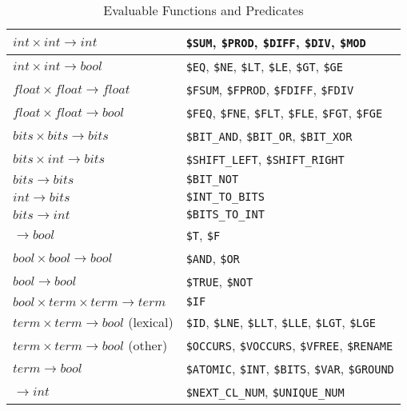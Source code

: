 \documentclass[11pt]{article}
\begin{document}
\begin{table}[ht] \centering
\caption{Evaluable Functions and Predicates}  \label{eval-tab}
\begin{tabular}{|l|l|}
\hline
$int \times int \rightarrow int$ & \verb:$SUM:, \verb:$PROD:, \verb:$DIFF:, \verb:$DIV:, \verb:$MOD: \\
\hline
$int \times int \rightarrow bool$ & \verb:$EQ:, \verb:$NE:, \verb:$LT:, \verb:$LE:, \verb:$GT:, \verb:$GE: \\
\hline
\hline
$float \times float \rightarrow float$ & \verb:$FSUM:, \verb:$FPROD:, \verb:$FDIFF:, \verb:$FDIV: \\
\hline
$float \times float \rightarrow bool$ & \verb:$FEQ:, \verb:$FNE:, \verb:$FLT:, \verb:$FLE:, \verb:$FGT:, \verb:$FGE: \\
\hline
\hline
$bits \times bits \rightarrow bits$ & \verb:$BIT_AND:, \verb:$BIT_OR:, \verb:$BIT_XOR: \\
\hline
$bits \times int \rightarrow bits$ & \verb:$SHIFT_LEFT:, \verb:$SHIFT_RIGHT:  \\
\hline
$bits \rightarrow bits$ & \verb:$BIT_NOT: \\
\hline
$int \rightarrow bits$ & \verb:$INT_TO_BITS: \\
\hline
$bits \rightarrow int$ & \verb:$BITS_TO_INT: \\
\hline
\hline
$\rightarrow bool$ & \verb:$T:, \verb:$F: \\
\hline
$bool \times bool \rightarrow bool$ & \verb:$AND:, \verb:$OR: \\
\hline
$bool \rightarrow bool$ & \verb:$TRUE:, \verb:$NOT: \\
\hline
$bool \times term \times term \rightarrow term$ & \verb:$IF: \\
\hline
\hline
$term \times term \rightarrow bool$ (lexical) & \verb:$ID:, \verb:$LNE:, \verb:$LLT:, \verb:$LLE:, \verb:$LGT:, \verb:$LGE: \\
\hline
$term \times term \rightarrow bool$ (other) & \verb:$OCCURS:, \verb:$VOCCURS:, \verb:$VFREE:, \verb:$RENAME: \\
\hline
$term \rightarrow bool$ & \verb:$ATOMIC:, \verb:$INT:, \verb:$BITS:, \verb:$VAR:, \verb:$GROUND:  \\
\hline
\hline
$\rightarrow int$ & \verb:$NEXT_CL_NUM:, \verb:$UNIQUE_NUM:  \\
\hline
\end{tabular}
\end{table}
\end{document}

